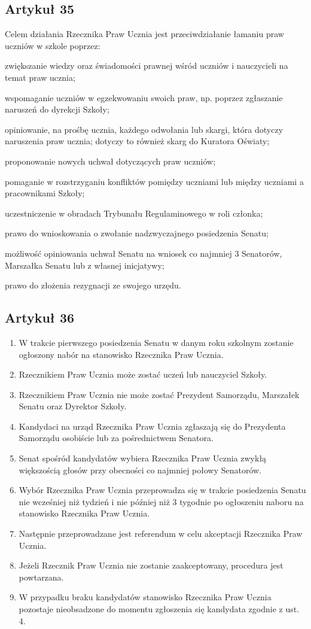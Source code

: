 \documentclass[14pt]{article}
\newcounter{podpunktyCounter}
\newenvironment{podpunkty}
{%
	\begin{list}{\arabic{podpunktyCounter})}%
		{%
			\usecounter{podpunktyCounter}
			\setlength{\itemsep}{1pt}
			\setlength{\topsep}{3pt}
		}%
	}%
	{\end{list}}
\newenvironment{ustepy}{%
	\begin{enumerate}[leftmargin=1.5em, itemindent=1pt, labelwidth=1em, itemsep=5pt]
	}{%
	\end{enumerate}
}
\begin{document}
\subsection*{Artykuł 35}
Celem działania Rzecznika Praw Ucznia jest przeciwdziałanie łamaniu praw uczniów w szkole poprzez:
\begin{podpunkty}
	\item zwiększanie wiedzy oraz świadomości prawnej wśród uczniów i nauczycieli na temat praw ucznia;
	\item wspomaganie uczniów w egzekwowaniu swoich praw, np. poprzez zgłaszanie naruszeń do dyrekcji Szkoły;
	\item opiniowanie, na prośbę ucznia, każdego odwołania lub skargi, która dotyczy naruszenia praw ucznia; dotyczy to również skarg do Kuratora Oświaty;
	\item proponowanie nowych uchwał dotyczących praw uczniów;
	\item pomaganie w rozstrzyganiu konfliktów pomiędzy uczniami lub między uczniami a pracownikami Szkoły;
	\item uczestniczenie w obradach Trybunału Regulaminowego w roli członka;
	\item prawo do wnioskowania o zwołanie nadzwyczajnego posiedzenia Senatu;
	\item możliwość opiniowania uchwał Senatu na wniosek co najmniej 3 Senatorów, Marszałka Senatu lub z własnej inicjatywy;
	\item prawo do złożenia rezygnacji ze swojego urzędu.
\end{podpunkty}
\subsection*{Artykuł 36}
\begin{ustepy}
	\item W trakcie pierwszego posiedzenia Senatu w danym roku szkolnym zostanie ogłoszony nabór na stanowisko Rzecznika Praw Ucznia.
	\item Rzecznikiem Praw Ucznia może zostać uczeń lub nauczyciel Szkoły.
	\item Rzecznikiem Praw Ucznia nie może zostać Prezydent Samorządu, Marszałek Senatu oraz Dyrektor Szkoły.
	\item Kandydaci na urząd Rzecznika Praw Ucznia zgłaszają się do Prezydenta  Samorządu osobiście lub za pośrednictwem Senatora.
	\item Senat spośród kandydatów wybiera Rzecznika Praw Ucznia zwykłą większością głosów przy obecności co najmniej połowy Senatorów.
	\item Wybór Rzecznika Praw Ucznia przeprowadza się w trakcie posiedzenia Senatu nie wcześniej niż tydzień i nie później niż 3 tygodnie po ogłoszeniu naboru na stanowisko Rzecznika Praw Ucznia.
	\item Następnie przeprowadzane jest referendum w celu akceptacji Rzecznika Praw Ucznia.
	\item Jeżeli Rzecznik Praw Ucznia nie zostanie zaakceptowany, procedura jest powtarzana.
	\item W przypadku braku kandydatów stanowisko Rzecznika Praw Ucznia pozostaje nieobsadzone do momentu zgłoszenia się kandydata zgodnie z ust. 4. 
	\end{ustepy}
\end{document}
